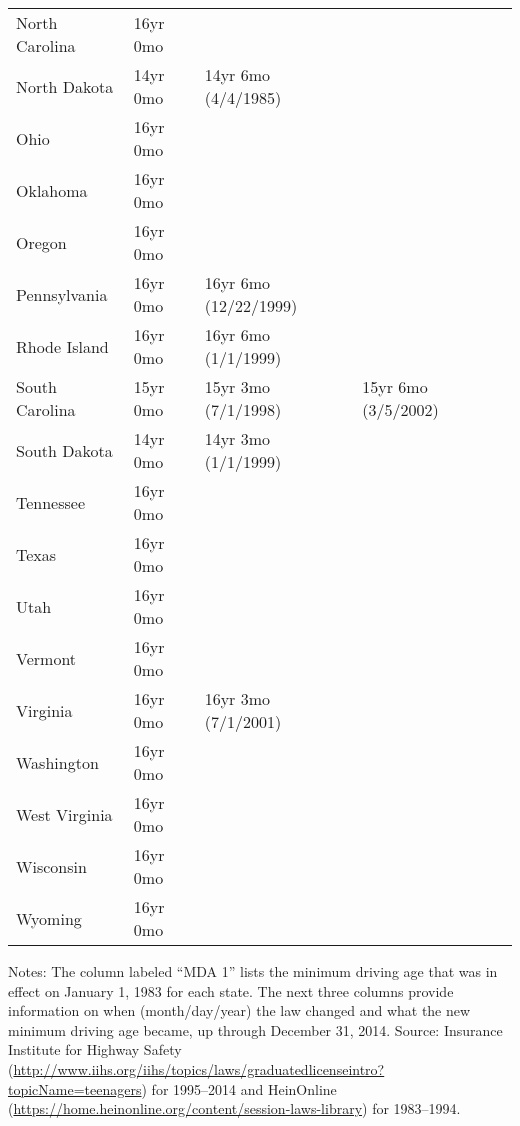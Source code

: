 \documentclass[letterpaper,12pt]{article}
\newcommand\Bstrut{\rule[-3ex]{0pt}{0pt}}   %
\begin{document}
\begin{longtable}{@{\extracolsep{\fill}}lllll@{}}
North Carolina & 
16yr 0mo \Bstrut\\

North Dakota & 
14yr 0mo &
14yr 6mo (4/4/1985) \Bstrut\\

Ohio & 
16yr 0mo \Bstrut\\

Oklahoma & 
16yr 0mo \Bstrut\\

Oregon & 
16yr 0mo \Bstrut\\

Pennsylvania & 
16yr 0mo &
16yr 6mo (12/22/1999) \Bstrut\\

Rhode Island & 
16yr 0mo &
16yr 6mo (1/1/1999) \Bstrut\\

South Carolina & 
15yr 0mo &
15yr 3mo (7/1/1998) & 
15yr 6mo (3/5/2002) \Bstrut\\

South Dakota & 
14yr 0mo &
14yr 3mo (1/1/1999) \Bstrut\\

Tennessee &
16yr 0mo \Bstrut\\

Texas &
16yr 0mo \Bstrut\\

Utah &
16yr 0mo \Bstrut\\

Vermont &
16yr 0mo \Bstrut\\

Virginia & 
16yr 0mo &
16yr 3mo (7/1/2001) \Bstrut\\

Washington &
16yr 0mo \Bstrut\\

West Virginia &
16yr 0mo \Bstrut\\

Wisconsin &
16yr 0mo \Bstrut\\

Wyoming &
16yr 0mo \Bstrut\\


\end{longtable}
\begin{flushleft}
\scriptsize Notes: The column labeled ``MDA 1'' lists the minimum driving age that was in effect on January 1, 1983 for each state. The next three columns provide information on when (month/day/year) the law changed and what the new minimum driving age became, up through December 31, 2014. Source: Insurance Institute for Highway Safety \mbox{(\url{http://www.iihs.org/iihs/topics/laws/graduatedlicenseintro?topicName=teenagers})} for 1995--2014 and HeinOnline \mbox{(\url{https://home.heinonline.org/content/session-laws-library})} for 1983--1994.
\end{flushleft}

\end{document}
